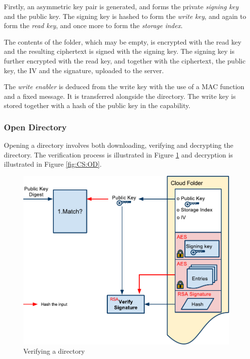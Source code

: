 \documentclass[pdftex,english,10pt,b5paper,twoside]{book}
\begin{document}
Firstly, an asymmetric key pair is generated, and forms the private
\emph{signing key} and the public key. The signing key is hashed to form the
\emph{write key}, and again to form the \emph{read key}, and once more to
form the \emph{storage index}.

The contents of the folder, which may be empty, is encrypted with the read key
and the resulting ciphertext is signed with the signing key. The signing key is
further encrypted with the read key, and together with the ciphertext, the
public key, the \ac{IV} and the signature, uploaded to the server.

The \emph{write enabler} is deduced from the write key with the use of a
\ac{MAC} function and a fixed message. It is transferred alongside the
directory.  The write key is stored together with a hash of the public key in
the capability.

\subsubsection{Open Directory}

Opening a directory involves both downloading, verifying and decrypting the
directory. The verification process is illustrated in Figure \ref{fig:CS:VOD}
and decryption is illustrated in Figure \ref{fig:CS:OD}.

\begin{figure}[h!]
    \centering
    \includegraphics[width=\columnwidth]{CryptoVerifyOpenFolder.pdf}
    \caption{Verifying a directory}
    \label{fig:CS:VOD}
\end{figure}
\end{document}
